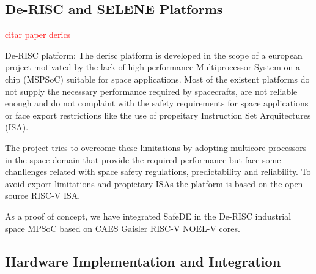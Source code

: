 \subsection{De-RISC and SELENE Platforms}

\textcolor{red}{citar paper derics}

De-RISC platform: The derisc platform is developed in the scope of a european project motivated by the lack of high performance Multiprocessor System on a chip (MSPSoC) suitable for space applications. Most of the existent platforms do not supply the necessary performance required by spacecrafts, are not reliable enough and do not complaint with the safety requirements for space applications or face export restrictions like the use of propeitary Instruction Set Arquitectures (ISA). 

The project tries to overcome these limitations by adopting multicore processors in the space domain that provide the required performance but face some chanllenges related with space safety regulations, predictability and reliability. To avoid export limitations and propietary ISAs the platform is based on the open source RISC-V ISA. 

As a proof of concept, we have integrated SafeDE in the De-RISC industrial space MPSoC based on CAES Gaisler RISC-V NOEL-V cores. 



\subsection{Hardware Implementation and Integration}
